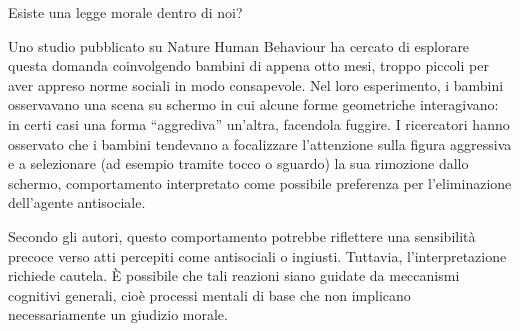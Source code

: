 \documentclass[12pt]{book} %
\begin{document}
\begin{mdframed}[linewidth=1pt]
Esiste una legge morale dentro di noi?

Uno studio pubblicato su Nature Human Behaviour ha cercato di esplorare questa domanda coinvolgendo bambini di appena otto mesi, troppo piccoli per aver appreso norme sociali in modo consapevole.
Nel loro esperimento, i bambini osservavano una scena su schermo in cui alcune forme geometriche interagivano: in certi casi una forma “aggrediva” un’altra, facendola fuggire. I ricercatori hanno osservato che i bambini tendevano a focalizzare l’attenzione sulla figura aggressiva e a selezionare (ad esempio tramite tocco o sguardo) la sua rimozione dallo schermo, comportamento interpretato come possibile preferenza per l’eliminazione dell’agente antisociale.

Secondo gli autori, questo comportamento potrebbe riflettere una sensibilità precoce verso atti percepiti come antisociali o ingiusti. Tuttavia, l’interpretazione richiede cautela. È possibile che tali reazioni siano guidate da meccanismi cognitivi generali, cioè processi mentali di base che non implicano necessariamente un giudizio morale.
\end{mdframed}
\end{document}
